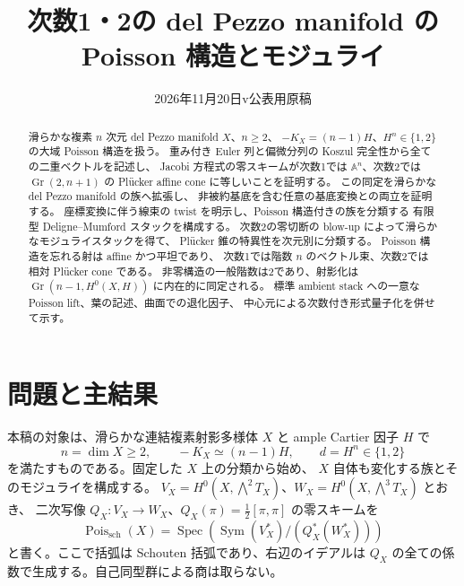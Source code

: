 \documentclass[a4paper,11pt]{ltjsarticle}
\title{次数1・2の del Pezzo manifold の\texorpdfstring{\\}{ }Poisson 構造とモジュライ}
\author{}
\date{2026年11月20日\quad v\Version\quad 公表用原稿}
\numberwithin{equation}{section}
\theoremstyle{plain}
\theoremstyle{definition}
\newcommand{\Pois}{\operatorname{Pois}}
\begin{document}
\maketitle
\begin{abstract}
滑らかな複素 $n$ 次元 del Pezzo manifold $X$、$n\geq2$、
$-K_X=(n-1)H$、$H^n\in\{1,2\}$ の大域 Poisson 構造を扱う。
重み付き Euler 列と偏微分列の Koszul 完全性から全ての二重ベクトルを記述し、
Jacobi 方程式の零スキームが次数1では $\mathbb A^n$、次数2では
$\operatorname{Gr}(2,n+1)$ の Pl\"ucker affine cone に等しいことを証明する。
この同定を滑らかな del Pezzo manifold の族へ拡張し、
非被約基底を含む任意の基底変換との両立を証明する。
座標変換に伴う線束の twist を明示し、Poisson 構造付きの族を分類する
有限型 Deligne--Mumford スタックを構成する。
次数2の零切断の blow-up によって滑らかなモジュライスタックを得て、
Pl\"ucker 錐の特異性を次元別に分類する。
Poisson 構造を忘れる射は affine かつ平坦であり、
次数1では階数 $n$ のベクトル束、次数2では相対 Pl\"ucker cone である。
非零構造の一般階数は2であり、射影化は
$\operatorname{Gr}(n-1,H^0(X,H))$ に内在的に同定される。
標準 ambient stack への一意な Poisson lift、葉の記述、曲面での退化因子、
中心元による次数付き形式量子化を併せて示す。
\end{abstract}
\tableofcontents

\section{問題と主結果}
\label{sec:introduction}
本稿の対象は、滑らかな連結複素射影多様体 $X$ と ample Cartier 因子 $H$ で
\[
 n=\dim X\geq2,\qquad -K_X\simeq(n-1)H,\qquad d=H^n\in\{1,2\}
\]
を満たすものである。固定した $X$ 上の分類から始め、
$X$ 自体も変化する族とそのモジュライを構成する。
$V_X=H^0(X,\bigwedge^2T_X)$、$W_X=H^0(X,\bigwedge^3T_X)$ とおき、
二次写像 $Q_X:V_X\to W_X$、$Q_X(\pi)=\frac12[\pi,\pi]$ の零スキームを
\[
 \Pois_{\mathrm{sch}}(X)=
 \operatorname{Spec}\!\left(\operatorname{Sym}(V_X^*)/
       (Q_X^*(W_X^*))\right)
\]
と書く。ここで括弧は Schouten 括弧であり、右辺のイデアルは
$Q_X$ の全ての係数で生成する。自己同型群による商は取らない。
\end{document}

